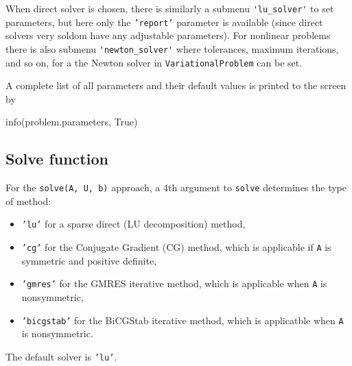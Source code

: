 
When direct solver is chosen, there is similarly a submenu
{\fontsize{10pt}{10pt}\verb!'lu_solver'!} to set parameters, but here only the {\fontsize{10pt}{10pt}\texttt{'report'}}
parameter is available (since direct solvers very soldom have any
adjustable parameters). For nonlinear problems there is also 
submenu {\fontsize{10pt}{10pt}\verb!'newton_solver'!} where tolerances, maximum iterations, and
so on, for a the Newton solver in {\fontsize{10pt}{10pt}\texttt{VariationalProblem}} can be set.

A complete list of all parameters and their default values
is printed to the screen by
\begin{python}
info(problem.parameters, True)
\end{python}

\subsection{Solve function}

For the {\fontsize{10pt}{10pt}\texttt{solve(A, U, b)}} approach, a 4th argument to {\fontsize{10pt}{10pt}\texttt{solve}}
determines the type of method: 
\begin{itemize}
\item {\fontsize{10pt}{10pt}\texttt{'lu'}} for a sparse direct (LU decomposition) method, 
\item {\fontsize{10pt}{10pt}\texttt{'cg'}} for the Conjugate Gradient (CG) method, which is
applicable if {\fontsize{10pt}{10pt}\texttt{A}} is symmetric and positive definite,
\item {\fontsize{10pt}{10pt}\texttt{'gmres'}} for
the GMRES iterative method, which is applicable when {\fontsize{10pt}{10pt}\texttt{A}} is nonsymmetric,
\item {\fontsize{10pt}{10pt}\texttt{'bicgstab'}} for
the BiCGStab iterative method, which is applicatble when {\fontsize{10pt}{10pt}\texttt{A}} is
nonsymmetric.
\end{itemize}
The default solver is {\fontsize{10pt}{10pt}\texttt{'lu'}}.

